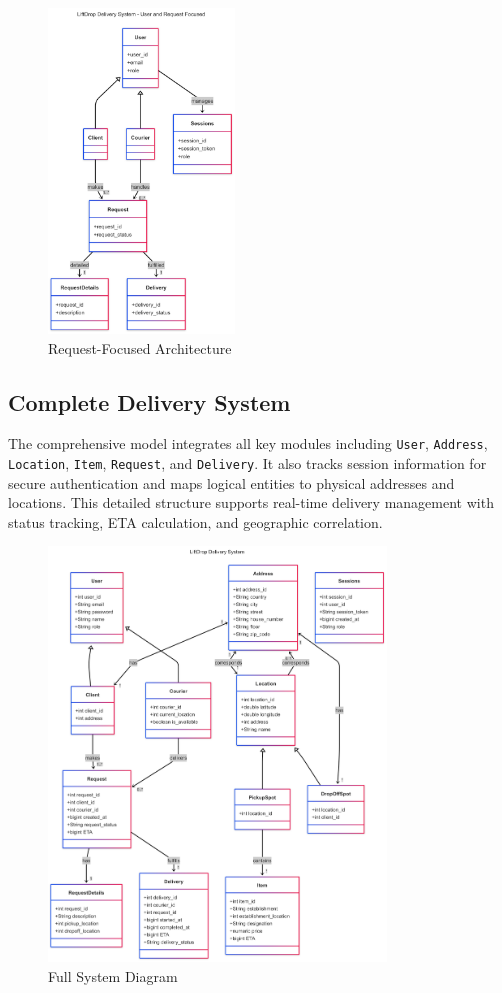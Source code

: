\begin{figure}[H]
    \centering
    \includegraphics[width=0.44\textwidth]{images/UserSessions.png}
    \caption{Request-Focused Architecture}
\end{figure}

\newpage

\subsection{Complete Delivery System}

The comprehensive model integrates all key modules including \texttt{User}, \texttt{Address}, \texttt{Location}, \texttt{Item}, \texttt{Request}, and \texttt{Delivery}. It also tracks session information for secure authentication and maps logical entities to physical addresses and locations. This detailed structure supports real-time delivery management with status tracking, ETA calculation, and geographic correlation.

\begin{figure}[H]
    \centering
    \includegraphics[width=0.8\textwidth]{images/FullDiagram.png}
    \caption{Full System Diagram}
\end{figure}



